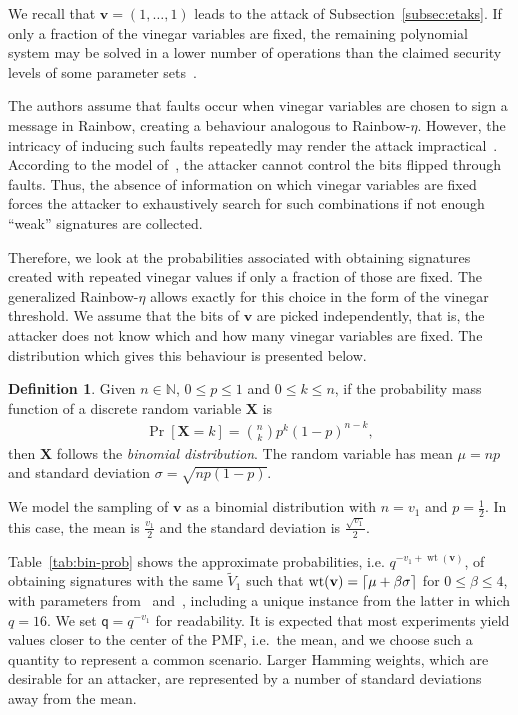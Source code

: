 \documentclass[english]{ufsc-thesis-rn46-2019/ufsc-thesis-rn46-2019}
\DeclareMathOperator*{\wt}{wt}
\DeclarePairedDelimiter{\ceil}{\lceil}{\rceil}
\theoremstyle{definition}
\newtheorem{definition}[theorem]{Definition}
\begin{document}
We recall that $\mathbf{v} = (1, \dots, 1)$ leads to the attack of
Subsection~\ref{subsec:etaks}. If only a fraction of the vinegar variables are
fixed, the remaining polynomial system may be solved in a lower number of
operations than the claimed security levels of some parameter
sets~\cite{Shim:202002}.

The authors assume that faults occur when vinegar variables are chosen to sign
a message in Rainbow, creating a behaviour analogous to
Rainbow-$\eta$. However, the intricacy of inducing such faults repeatedly may
render the attack impractical~\cite{Mus:202011}. According to the model
of~\cite{Shim:202002}, the attacker cannot control the bits flipped through
faults. Thus, the absence of information on which vinegar variables are fixed
forces the attacker to exhaustively search for such combinations if not enough
``weak'' signatures are collected.

Therefore, we look at the probabilities associated with obtaining signatures
created with repeated vinegar values if only a fraction of those are fixed. The
generalized Rainbow-$\eta$ allows exactly for this choice in the form of the
vinegar threshold. We assume that the bits of $\mathbf{v}$ are picked
independently, that is, the attacker does not know which and how many vinegar
variables are fixed. The distribution which gives this behaviour is presented
below.
\begin{definition}
  Given $n \in \mathbb{N}$, $0 \leq p \leq 1$ and $0 \leq k \leq n$, if the
  probability mass function of a discrete random variable $\mathbf{X}$ is
  \begin{align*}
    \Pr[\mathbf{X} = k] = \binom{n}{k} p^{k} {(1 - p)}^{n - k},
  \end{align*}
  then $\mathbf{X}$ follows the \emph{binomial distribution}. The random
  variable has mean $\mu = np$ and standard deviation
  $\sigma = \sqrt{np(1 - p)}$.
\end{definition}
We model the sampling of $\mathbf{v}$ as a binomial distribution with
$n = v_{1}$ and $p = \frac{1}{2}$. In this case, the mean is $\frac{v_{1}}{2}$
and the standard deviation is $\frac{\sqrt{v_{1}}}{2}$.

Table~\ref{tab:bin-prob} shows the approximate probabilities, i.e.
$q^{-v_{1} + \wt(\mathbf{v})}$, of obtaining signatures with the same
$\widetilde{V}_{1}$ such that $\wt(\mathbf{v}) = \ceil{\mu + \beta \sigma}$ for
$0 \leq \beta \leq 4$, with parameters from~\cite[Tab.~9.8]{Petzoldt:201307}
and~\cite[Sec.~4]{Ding:202006}, including a unique instance from the latter in
which $q = 16$. We set $\mathsf{q} = q^{-v_{1}}$ for readability. It is
expected that most experiments yield values closer to the center of the PMF,
i.e.\ the mean, and we choose such a quantity to represent a common
scenario. Larger Hamming weights, which are desirable for an attacker, are
represented by a number of standard deviations away from the mean.
\end{document}
